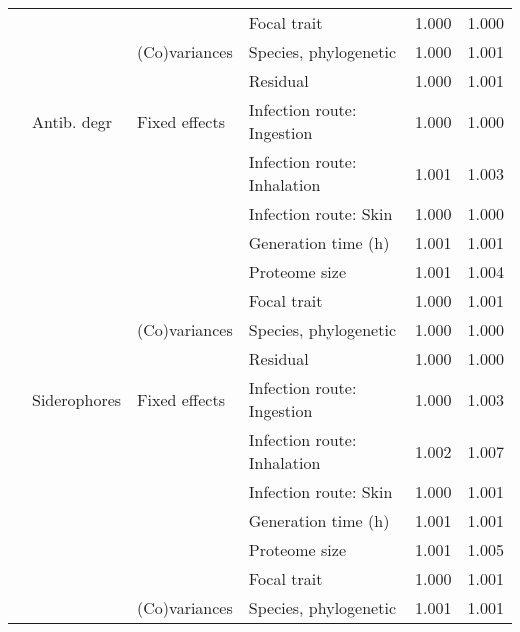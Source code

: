 \begin{longtable}[t]{llllll}
\hspace{1em} &  &  & Focal trait & 1.000 & \vphantom{2} 1.000\\
\hspace{1em} &  & (Co)variances & Species, phylogenetic & 1.000 & 1.001\\
\hspace{1em} &  &  & Residual & 1.000 & \vphantom{1} 1.001\\
\hspace{1em} & Antib. degr & Fixed effects & Infection route: Ingestion & 1.000 & 1.000\\
\hspace{1em} &  &  & Infection route: Inhalation & 1.001 & 1.003\\
\hspace{1em} &  &  & Infection route: Skin & 1.000 & \vphantom{2} 1.000\\
\hspace{1em} &  &  & Generation time (h) & 1.001 & \vphantom{1} 1.001\\
\hspace{1em} &  &  & Proteome size & 1.001 & 1.004\\
\hspace{1em} &  &  & Focal trait & 1.000 & \vphantom{1} 1.001\\
\hspace{1em} &  & (Co)variances & Species, phylogenetic & 1.000 & \vphantom{1} 1.000\\
\hspace{1em} &  &  & Residual & 1.000 & 1.000\\
\hspace{1em} & Siderophores & Fixed effects & Infection route: Ingestion & 1.000 & 1.003\\
\hspace{1em} &  &  & Infection route: Inhalation & 1.002 & 1.007\\
\hspace{1em} &  &  & Infection route: Skin & 1.000 & \vphantom{1} 1.001\\
\hspace{1em} &  &  & Generation time (h) & 1.001 & 1.001\\
\hspace{1em} &  &  & Proteome size & 1.001 & 1.005\\
\hspace{1em} &  &  & Focal trait & 1.000 & 1.001\\
\hspace{1em} &  & (Co)variances & Species, phylogenetic & 1.001 & \vphantom{1} 1.001\\

\end{longtable}
